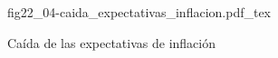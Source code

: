 \begin{figure}[h]
\centering
\def\svgwidth{0.5\textwidth}
{fig22_04-caida_expectativas_inflacion.pdf_tex}
\caption{Caída de las expectativas de inflación}
\label{fig22_04-caida_expectativas_inflacion}
\end{figure}